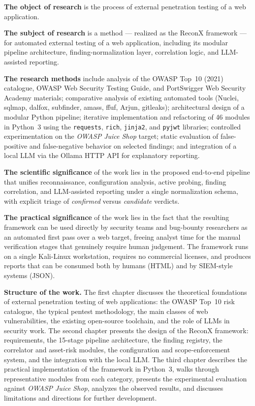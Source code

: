 \textbf{The object of research} is the process of external penetration testing of a web application.

\textbf{The subject of research} is a method --- realized as the ReconX framework --- for automated external testing of a web application, including its modular pipeline architecture, finding-normalization layer, correlation logic, and LLM-assisted reporting.

\textbf{The research methods} include analysis of the OWASP Top~10 (2021) catalogue, OWASP Web Security Testing Guide, and PortSwigger Web Security Academy materials; comparative analysis of existing automated tools (Nuclei, sqlmap, dalfox, subfinder, amass, ffuf, Arjun, gitleaks); architectural design of a modular Python pipeline; iterative implementation and refactoring of 46 modules in Python~3 using the \texttt{requests}, \texttt{rich}, \texttt{jinja2}, and \texttt{pyjwt} libraries; controlled experimentation on the \textit{OWASP Juice Shop} target; static evaluation of false-positive and false-negative behavior on selected findings; and integration of a local LLM via the Ollama HTTP API for explanatory reporting.

\textbf{The scientific significance} of the work lies in the proposed end-to-end pipeline that unifies reconnaissance, configuration analysis, active probing, finding correlation, and LLM-assisted reporting under a single normalization schema, with explicit triage of \textit{confirmed} versus \textit{candidate} verdicts.

\textbf{The practical significance} of the work lies in the fact that the resulting framework can be used directly by security teams and bug-bounty researchers as an automated first pass over a web target, freeing analyst time for the manual verification stages that genuinely require human judgement. The framework runs on a single Kali-Linux workstation, requires no commercial licenses, and produces reports that can be consumed both by humans (HTML) and by SIEM-style systems (JSON).

\textbf{Structure of the work.} The first chapter discusses the theoretical foundations of external penetration testing of web applications: the OWASP Top~10 risk catalogue, the typical pentest methodology, the main classes of web vulnerabilities, the existing open-source toolchain, and the role of LLMs in security work. The second chapter presents the design of the ReconX framework: requirements, the 15-stage pipeline architecture, the finding registry, the correlator and asset-risk modules, the configuration and scope-enforcement system, and the integration with the local LLM. The third chapter describes the practical implementation of the framework in Python~3, walks through representative modules from each category, presents the experimental evaluation against \textit{OWASP Juice Shop}, analyzes the observed results, and discusses limitations and directions for further development.
